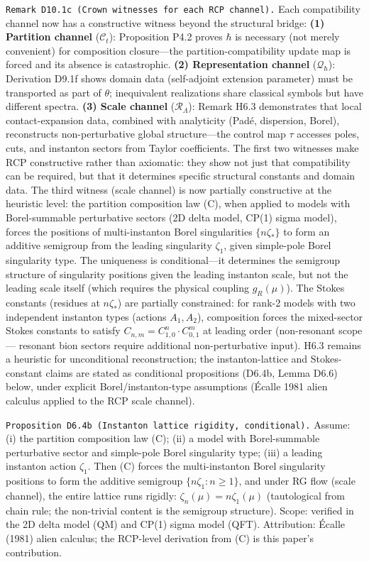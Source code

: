 \documentclass[
]{article}
\begin{document}
\texttt{Remark\ D10.1c\ (Crown\ witnesses\ for\ each\ RCP\ channel).}
Each compatibility channel now has a constructive witness beyond the
structural bridge: \textbf{(1) Partition channel} (\(\mathcal C_t\)):
Proposition P4.2 proves \(\hbar\) is necessary (not merely convenient)
for composition closure---the partition-compatibility update map is
forced and its absence is catastrophic. \textbf{(2) Representation
channel} (\(\mathcal Q_\hbar\)): Derivation D9.1f shows domain data
(self-adjoint extension parameter) must be transported as part of
\(\theta\); inequivalent realizations share classical symbols but have
different spectra. \textbf{(3) Scale channel} (\(\mathcal R_\Lambda\)):
Remark H6.3 demonstrates that local contact-expansion data, combined
with analyticity (Padé, dispersion, Borel), reconstructs
non-perturbative global structure---the control map \(\tau\) accesses
poles, cuts, and instanton sectors from Taylor coefficients. The first
two witnesses make RCP constructive rather than axiomatic: they show not
just that compatibility can be required, but that it determines specific
structural constants and domain data. The third witness (scale channel)
is now partially constructive at the heuristic level: the partition
composition law (C), when applied to models with Borel-summable
perturbative sectors (2D delta model, CP(1) sigma model), forces the
positions of multi-instanton Borel singularities \(\{n\zeta_*\}\) to
form an additive semigroup from the leading singularity \(\zeta_1\),
given simple-pole Borel singularity type. The uniqueness is
conditional---it determines the semigroup structure of singularity
positions given the leading instanton scale, but not the leading scale
itself (which requires the physical coupling \(g_R(\mu)\)). The Stokes
constants (residues at \(n\zeta_*\)) are partially constrained: for
rank-2 models with two independent instanton types (actions
\(A_1, A_2\)), composition forces the mixed-sector Stokes constants to
satisfy \(C_{n,m} = C_{1,0}^n \cdot C_{0,1}^m\) at leading order
(non-resonant scope --- resonant bion sectors require additional
non-perturbative input). H6.3 remains a heuristic for unconditional
reconstruction; the instanton-lattice and Stokes-constant claims are
stated as conditional propositions (D6.4b, Lemma D6.6) below, under
explicit Borel/instanton-type assumptions (Écalle 1981 alien calculus
applied to the RCP scale channel).

\texttt{Proposition\ D6.4b\ (Instanton\ lattice\ rigidity,\ conditional).}
Assume: (i) the partition composition law (C); (ii) a model with
Borel-summable perturbative sector and simple-pole Borel singularity
type; (iii) a leading instanton action \(\zeta_1\). Then (C) forces the
multi-instanton Borel singularity positions to form the additive
semigroup \(\{n\zeta_1 : n\ge 1\}\), and under RG flow (scale channel),
the entire lattice runs rigidly: \(\zeta_n(\mu) = n\zeta_1(\mu)\)
(tautological from chain rule; the non-trivial content is the semigroup
structure). Scope: verified in the 2D delta model (QM) and CP(1) sigma
model (QFT). Attribution: Écalle (1981) alien calculus; the RCP-level
derivation from (C) is this paper's contribution.
\end{document}
